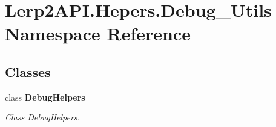 \hypertarget{namespace_lerp2_a_p_i_1_1_hepers_1_1_debug___utils}{}\section{Lerp2\+A\+P\+I.\+Hepers.\+Debug\+\_\+\+Utils Namespace Reference}
\label{namespace_lerp2_a_p_i_1_1_hepers_1_1_debug___utils}
\subsection*{Classes}
\begin{DoxyCompactItemize}
\item 
class {\bfseries Debug\+Helpers}
\begin{DoxyCompactList}\small\item\em Class Debug\+Helpers. \end{DoxyCompactList}\end{DoxyCompactItemize}
